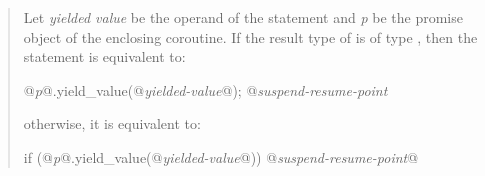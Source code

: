 \begin{quote}

Let \textit{yielded value} be the operand of the  statement and \textit{p} be the promise object of the enclosing coroutine.
If the result type of  is of type \cvvoid, then the  statement is equivalent to:

\begin{codeblock}
  @\textit{p}@.yield_value(@\textit{yielded-value}@);
  @\textit{suspend-resume-point}
\end{codeblock}

otherwise, it is equivalent to:

\begin{codeblock}
  if (@\textit{p}@.yield_value(@\textit{yielded-value}@)) {
    @\textit{suspend-resume-point}@
  }
  
\end{codeblock}


%
%
%    
%

\end{quote}